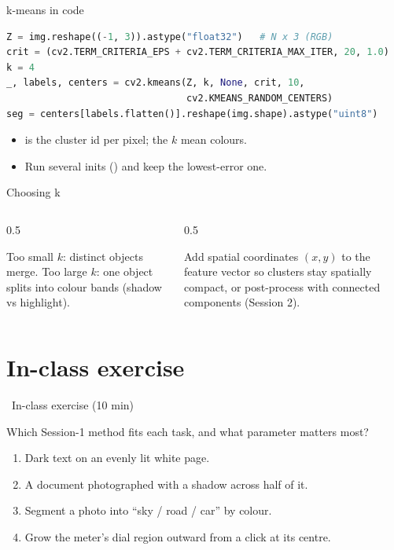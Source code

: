 \documentclass[10pt,aspectratio=169]{beamer}
\begin{document}
\begin{frame}[fragile]{k-means in code}
\begin{lstlisting}[language=Python]
Z = img.reshape((-1, 3)).astype("float32")   # N x 3 (RGB)
crit = (cv2.TERM_CRITERIA_EPS + cv2.TERM_CRITERIA_MAX_ITER, 20, 1.0)
k = 4
_, labels, centers = cv2.kmeans(Z, k, None, crit, 10,
                                cv2.KMEANS_RANDOM_CENTERS)
seg = centers[labels.flatten()].reshape(img.shape).astype("uint8")
\end{lstlisting}
  \begin{itemize}
    \item {} is the cluster id per pixel;  the $k$ mean colours.
    \item Run several inits () and keep the lowest-error one.
  \end{itemize}
\end{frame}

\begin{frame}{Choosing k}
  \begin{columns}[T]
    \begin{column}{0.5\textwidth}
      \begin{badbox}
        Too small $k$: distinct objects merge. Too large $k$: one object splits into
        colour bands (shadow vs highlight).
      \end{badbox}
    \end{column}
    \begin{column}{0.5\textwidth}
      \begin{goodbox}
        Add spatial coordinates $(x,y)$ to the feature vector so clusters stay
        spatially compact, or post-process with connected components (Session 2).
      \end{goodbox}
    \end{column}
  \end{columns}
\end{frame}

\section{In-class exercise}

\begin{frame}{\faPen~In-class exercise (10 min)}
  \begin{infobox}
  \end{infobox}
  Which Session-1 method fits each task, and what parameter matters most?
  \begin{enumerate}
    \item Dark text on an evenly lit white page.
    \item A document photographed with a shadow across half of it.
    \item Segment a photo into ``sky / road / car'' by colour.
    \item Grow the meter's dial region outward from a click at its centre.
  \end{enumerate}
\end{frame}
\end{document}
